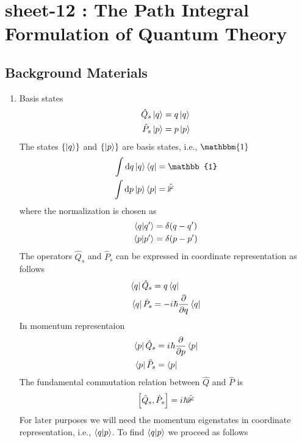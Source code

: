 

\chapter{sheet-12 : The Path Integral Formulation of Quantum Theory}

\ifpdf
\graphicspath{{Chapter12/figs/}}
\else
\graphicspath{{Chapter12/figs/}}
\fi


\section{Background Materials}
\begin{enumerate}
	\item Basis states
	\begin{align}
		\hat{Q}_s \ket{q} &= q\ket{q} \\
		\hat{P}_s \ket{p} &= p\ket{p} 
	\end{align}
	The states $\{\ket{q}\}$ and $\{\ket{p}\}$ are basis states, i.e., $\mathbbm{1}$
	\begin{align}
		\int \dd{q} \ket{q}\bra{q} &= \mathbb{1} \\
		\int \dd{p} \ket{p}\bra{p} &= \mathbb{\hat{1}} \\
	\end{align}
	where the normalization is chosen as
	\begin{align}
		\braket{q}{q^\prime} &= \delta(q-q^\prime) \\
		\braket{p}{p^\prime} &= \delta(p-p^\prime) 
	\end{align}
	The operators $\hat{Q}_s$ and $\hat{P}_s$ can be expressed in coordinate representation as follows
	\begin{align}
		\bra{q}\hat{Q}_s &= q \bra{q} \\
		\bra{q}\hat{P}_s &= -{i\mkern1mu} \hbar \pdv{q} \bra{q} 
	\end{align}
	In momentum representaion
	\begin{align}
		\bra{p}\hat{Q}_s &= {i\mkern1mu} \hbar \pdv{p} \bra{p} \\
		\bra{p}\hat{P}_s &=  \bra{p} 
	\end{align}
	The fundamental commutation relation between $\hat{Q}$ and $\hat{P}$ is 
	\begin{equation}
		\left[\hat{Q}_s, \hat{P}_s\right] = {i\mkern1mu}
		 \hbar \mathbb{\hat{1}}
	\end{equation}
	For later purposes we will need the momentum eigenstates in coordinate representation, i.e., $\braket{q}{p}$. To find $\braket{q}{p}$ we proceed as follows

\end{enumerate}
